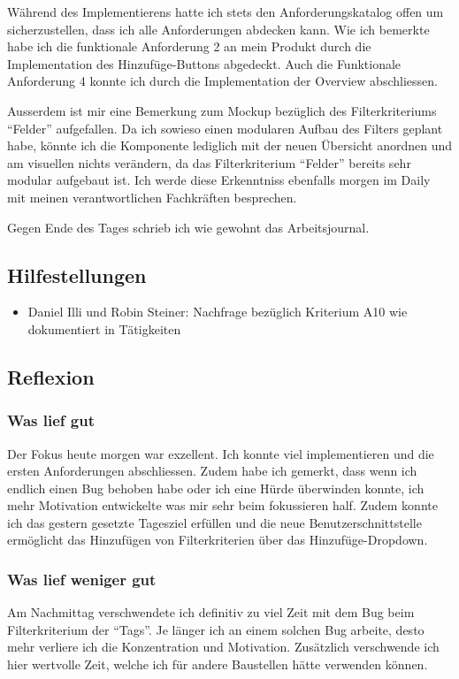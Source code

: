Während des Implementierens hatte ich stets den Anforderungskatalog offen um sicherzustellen, dass ich alle Anforderungen abdecken kann.
Wie ich bemerkte habe ich die funktionale Anforderung 2 an mein Produkt durch die Implementation des Hinzufüge-Buttons abgedeckt. Auch die Funktionale Anforderung 4 konnte
ich durch die Implementation der Overview abschliessen. 

Ausserdem ist mir eine Bemerkung zum Mockup bezüglich des Filterkriteriums ``Felder'' aufgefallen. Da ich sowieso einen modularen Aufbau des Filters geplant habe, könnte ich die 
Komponente lediglich mit der neuen Übersicht anordnen und am visuellen nichts verändern, da das Filterkriterium ``Felder'' bereits sehr modular aufgebaut ist. Ich werde diese Erkenntniss ebenfalls
morgen im Daily mit meinen verantwortlichen Fachkräften besprechen. 

Gegen Ende des Tages schrieb ich wie gewohnt das Arbeitsjournal.


\subsection*{Hilfestellungen}
\begin{itemize}
    \item Daniel Illi und Robin Steiner: Nachfrage bezüglich Kriterium A10 wie dokumentiert in Tätigkeiten
\end{itemize}

\subsection*{Reflexion}

\subsubsection*{Was lief gut}
Der Fokus heute morgen war exzellent. Ich konnte viel implementieren und die ersten Anforderungen abschliessen. 
Zudem habe ich gemerkt, dass wenn ich endlich einen Bug behoben habe oder ich eine Hürde überwinden konnte, ich mehr Motivation
entwickelte was mir sehr beim fokussieren half. Zudem konnte ich das gestern gesetzte Tagesziel erfüllen und die neue Benutzerschnittstelle ermöglicht das Hinzufügen
von Filterkriterien über das Hinzufüge-Dropdown.

\subsubsection*{Was lief weniger gut}
Am Nachmittag verschwendete ich definitiv zu viel Zeit mit dem Bug beim Filterkriterium der ``Tags''. Je länger ich an einem solchen Bug arbeite, desto mehr
verliere ich die Konzentration und Motivation. Zusätzlich verschwende ich hier wertvolle Zeit, welche ich für andere Baustellen hätte verwenden können.


